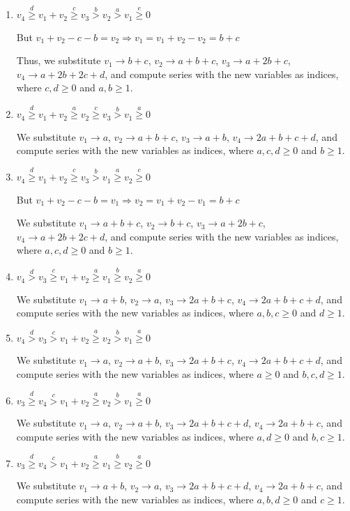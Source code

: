 \documentclass{article}
\begin{document}
\begin{enumerate}
\item 
$v_4\overset{d}{\geq}v_1+v_2\overset{c}{\geq}v_3\overset{b}{>}{v_2}\overset{a}{>}v_1\overset{e}{\geq}{0}$

But $v_1+v_2-c-b=v_2\Rightarrow{v_1=v_1+v_2-v_2=b+c}$

Thus, we substitute 
$v_1\rightarrow{b+c}$, 
$v_2\rightarrow{a+b+c}$, 
$v_3\rightarrow{a+2b+c}$, 
$v_4\rightarrow{a+2b+2c+d}$, and compute series with the new variables as indices, where $c,d\geq{0}$ and $a,b\geq{1}$.
\item 
$v_4\overset{d}{\geq}v_1+v_2\overset{a}{\geq}v_2\overset{c}{\geq}{v_3}\overset{b}{>}v_1\overset{a}{\geq}{0}$

We substitute 
$v_1\rightarrow{a}$, 
$v_2\rightarrow{a+b+c}$, 
$v_3\rightarrow{a+b}$, 
$v_4\rightarrow{2a+b+c+d}$, and compute series with the new variables as indices, where $a,c,d\geq{0}$ and $b\geq{1}$.
\item 
$v_4\overset{d}{\geq}v_1+v_2\overset{c}{\geq}v_3\overset{b}{>}{v_1}\overset{a}{\geq}v_2\overset{e}{\geq}{0}$

But $v_1+v_2-c-b=v_1\Rightarrow{v_2=v_1+v_2-v_1=b+c}$

We substitute 
$v_1\rightarrow{a+b+c}$, 
$v_2\rightarrow{b+c}$, 
$v_3\rightarrow{a+2b+c}$, 
$v_4\rightarrow{a+2b+2c+d}$, and compute series with the new variables as indices, where $a,c,d\geq{0}$ and $b\geq{1}$.
\item 
$v_4\overset{d}{>}v_3\overset{c}{\geq}v_1+v_2\overset{a}{\geq}{v_1}\overset{b}{\geq}v_2\overset{a}{\geq}{0}$

We substitute 
$v_1\rightarrow{a+b}$, 
$v_2\rightarrow{a}$, 
$v_3\rightarrow{2a+b+c}$, 
$v_4\rightarrow{2a+b+c+d}$, and compute series with the new variables as indices, where $a,b,c\geq{0}$ and $d\geq{1}$.
\item 
$v_4\overset{d}{>}v_3\overset{c}{>}v_1+v_2\overset{a}{\geq}{v_2}\overset{b}{>}v_1\overset{a}{\geq}{0}$

We substitute 
$v_1\rightarrow{a}$, 
$v_2\rightarrow{a+b}$, 
$v_3\rightarrow{2a+b+c}$, 
$v_4\rightarrow{2a+b+c+d}$, and compute series with the new variables as indices, where $a\geq{0}$ and $b,c,d\geq{1}$.
\item 
$v_3\overset{d}{\geq}v_4\overset{c}{>}v_1+v_2\overset{a}{\geq}{v_2}\overset{b}{>}v_1\overset{a}{\geq}{0}$

We substitute 
$v_1\rightarrow{a}$, 
$v_2\rightarrow{a+b}$, 
$v_3\rightarrow{2a+b+c+d}$, 
$v_4\rightarrow{2a+b+c}$, and compute series with the new variables as indices, where $a,d\geq{0}$ and $b,c\geq{1}$.
\item 
$v_3\overset{d}{\geq}v_4\overset{c}{>}v_1+v_2\overset{a}{\geq}{v_1}\overset{b}{\geq}v_2\overset{a}{\geq}{0}$

We substitute 
$v_1\rightarrow{a+b}$, 
$v_2\rightarrow{a}$, 
$v_3\rightarrow{2a+b+c+d}$, 
$v_4\rightarrow{2a+b+c}$, and compute series with the new variables as indices, where $a,b,d\geq{0}$ and $c\geq{1}$.
\end{enumerate}
\end{document}
